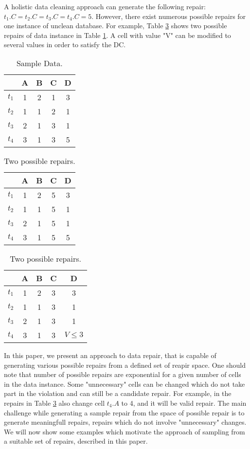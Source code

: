 A holistic data cleaning approach can generate the following repair:
$t_1.C = t_2.C = t_3.C = t_4.C = 5$.
However, there exist numerous possible repairs for one instance of unclean database.
For example, Table \ref{tab:eg2} shows two possible repairs of data instance in Table \ref{tab:eg1}.
A cell with value "V" can be modified to several values in order to satisfy the DC.
\begin{table} \label{tab:eg1}
\centering 
\begin{tabular}{|c|c|c|c|c|}  \hline
      & A & B & C & D 	\\ \hline
   $t_1$ & 1 & 2 & 1 & 3 	\\ \hline
   $t_2$ & 1 & 1 & 2 & 1 	\\ \hline
   $t_3$ & 2 & 1 & 3 & 1 	\\ \hline
   $t_4$ & 3 & 1 & 3 & 5 	\\ \hline
\end{tabular}
\caption{Sample Data.}
\end{table}

\begin{table} \label{tab:eg2}
\centering 
\begin{tabular}{|c|c|c|c|c|}  \hline
      & A & B & C & D 	\\ \hline
   $t_1$ & 1 & 2 & \cellcolor[gray]{0.9} 5 & 3 	\\ \hline
   $t_2$ & 1 & 1 & \cellcolor[gray]{0.9} 5 & 1 	\\ \hline
   $t_3$ & 2 & 1 & \cellcolor[gray]{0.9} 5 & 1 	\\ \hline
   $t_4$ & 3 & 1 & \cellcolor[gray]{0.9} 5 & 5 	\\ \hline
\end{tabular}
\quad
\begin{tabular}{|c|c|c|c|c|}  \hline
      & A & B & C & D 	\\ \hline
   $t_1$ & 1 & 2 & \cellcolor[gray]{0.9} 3 & 3 	\\ \hline
   $t_2$ & 1 & 1 & \cellcolor[gray]{0.9} 3 & 1 	\\ \hline
   $t_3$ & 2 & 1 & 3 & 1 	\\ \hline
   $t_4$ & 3 & 1 & 3 & \cellcolor[gray]{0.9} $V \leq 3$ 	\\ \hline
\end{tabular}
\caption{Two possible repairs.}
\end{table}

In this paper, we present an approach to data repair, that is capable of generating various possible repairs from a defined set of reapir space.
One should note that number of possible repairs are exponential for a given number of cells in the data instance.
Some "unnecessary" cells can be changed which do not take part in the violation and can still be a candidate repair.
For example, in the repairs in Table \ref{tab:eg2} also change cell $t_4.A$ to 4, and it will be valid repair.
The main challenge while generating a sample repair from the space of possible repair is to generate meaningfull repairs, repairs which do not involve "unnecessary" changes.
We will now show some examples which motivate the approach of sampling from a suitable set of repairs, described in this paper.

